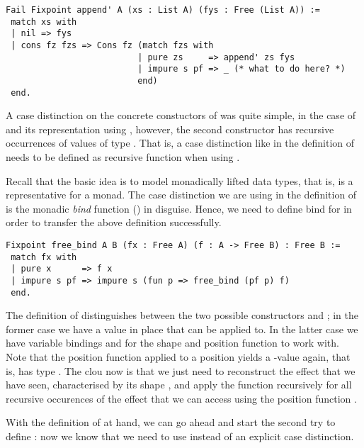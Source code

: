 \begin{verbatim}
Fail Fixpoint append' A (xs : List A) (fys : Free (List A)) :=
 match xs with
 | nil => fys
 | cons fz fzs => Cons fz (match fzs with
                          | pure zs     => append' zs fys
                          | impure s pf => _ (* what to do here? *)
                          end)
 end.
\end{verbatim}

A case distinction on the concrete constuctors of  was
quite simple, in the case of  and its representation using
, however, the second constructor  has
recursive occurrences of values of type .
That is, a case distinction like in the definition of 
needs to be defined as recursive function when using .

Recall that the basic idea is to model monadically lifted data types,
that is,  is a representative for a monad.
The case distinction we are using in the definition of  is
the monadic \emph{bind} function (\cinl{(>>=)}) in disguise.
Hence, we need to define bind for  in order to transfer the
above definition successfully.

\begin{verbatim}
Fixpoint free_bind A B (fx : Free A) (f : A -> Free B) : Free B :=
 match fx with
 | pure x      => f x
 | impure s pf => impure s (fun p => free_bind (pf p) f)
 end.
\end{verbatim}

The definition of  distinguishes between the two
possible constructors  and ; in the former
case we have a value  in place that  can be applied
to.
In the latter case we have variable bindings  and 
for the shape and position function to work with.
Note that the position function applied to a position
yields a -value again, that is,  has type
.
The clou now is that we just need to reconstruct the effect that we
have seen, characterised by its shape , and apply the function
 recursively for all recursive occurences of the effect that
we can access using the position function .

With the definition of  at hand, we can go ahead and
start the second try to define : now we know that we need
to use  instead of an explicit case distinction.

